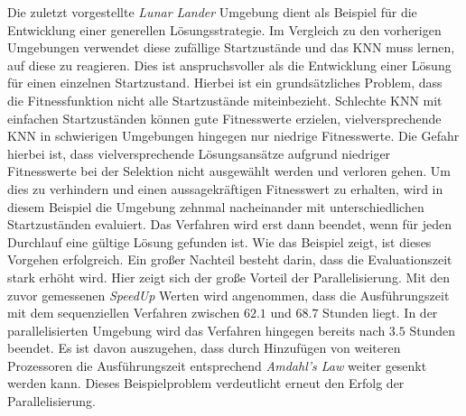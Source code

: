 Die zuletzt vorgestellte \emph{Lunar Lander} Umgebung dient als Beispiel für die Entwicklung einer generellen Lösungsstrategie. Im Vergleich zu den vorherigen Umgebungen verwendet diese zufällige Startzustände und das \ac{KNN} muss lernen, auf diese zu reagieren. Dies ist anspruchsvoller als die Entwicklung einer Lösung für einen einzelnen Startzustand. Hierbei ist ein grundsätzliches Problem, dass die Fitnessfunktion nicht alle Startzustände miteinbezieht. Schlechte \ac{KNN} mit einfachen Startzuständen können gute Fitnesswerte erzielen, vielversprechende \ac{KNN} in schwierigen Umgebungen hingegen nur niedrige Fitnesswerte. Die Gefahr hierbei ist, dass vielversprechende Lösungsansätze aufgrund niedriger Fitnesswerte bei der Selektion nicht ausgewählt werden und verloren gehen. Um dies zu verhindern und einen aussagekräftigen Fitnesswert zu erhalten, wird in diesem Beispiel die Umgebung zehnmal nacheinander mit unterschiedlichen Startzuständen evaluiert. Das Verfahren wird erst dann beendet, wenn für jeden Durchlauf eine gültige Lösung gefunden ist. Wie das Beispiel zeigt, ist dieses Vorgehen erfolgreich. Ein großer Nachteil besteht darin, dass die Evaluationszeit stark erhöht wird. Hier zeigt sich der große Vorteil der Parallelisierung. Mit den zuvor gemessenen \emph{SpeedUp} Werten wird angenommen, dass die Ausführungszeit mit dem sequenziellen Verfahren zwischen $62.1$ und $68.7$ Stunden liegt. In der parallelisierten Umgebung wird das Verfahren hingegen bereits nach $3.5$ Stunden beendet. Es ist davon auszugehen, dass durch Hinzufügen von weiteren Prozessoren die Ausführungszeit entsprechend \emph{Amdahl's Law} weiter gesenkt werden kann. Dieses Beispielproblem verdeutlicht erneut den Erfolg der Parallelisierung.
